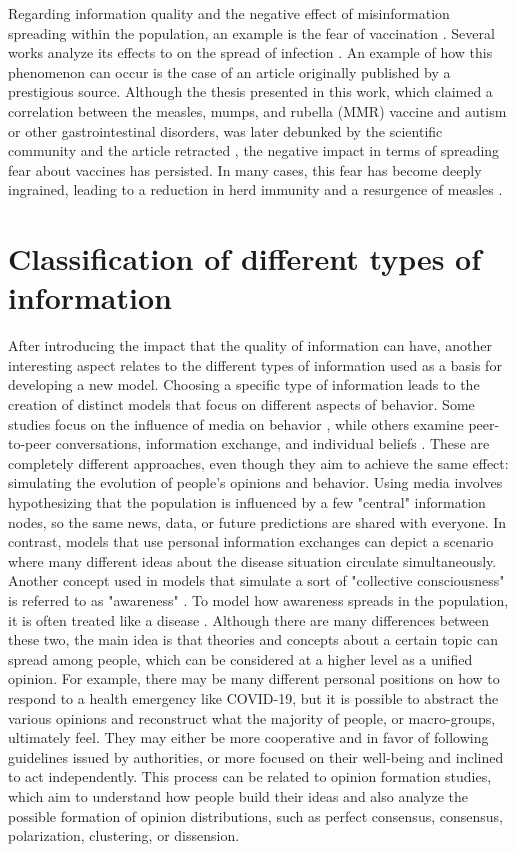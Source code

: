 Regarding information quality and the negative effect of misinformation spreading within the population, an example is the fear of vaccination \cite{Kahan_2013}. Several works analyze its effects to on the spread of infection \cite{Bauch_2012_game, Epstein_2021}.
An example of how this phenomenon can occur is the case of an article originally published by a prestigious source. Although the thesis presented in this work, which claimed a correlation between the measles, mumps, and rubella (MMR) vaccine and autism or other gastrointestinal disorders, was later debunked by the scientific community and the article retracted \cite{wakefield1998retracted}, the negative impact in terms of spreading fear about vaccines has persisted. In many cases, this fear has become deeply ingrained, leading to a reduction in herd immunity and a resurgence of measles \cite{Bauch_2012_overview}.

\section{Classification of different types of information}
After introducing the impact that the quality of information can have, another interesting aspect relates to the different types of information used as a basis for developing a new model. Choosing a specific type of information leads to the creation of distinct models that focus on different aspects of behavior. Some studies focus on the influence of media on behavior \cite{Collinson2014, Misra_2011}, while others examine peer-to-peer conversations, information exchange, and individual beliefs \cite{Tyson_2020}. These are completely different approaches, even though they aim to achieve the same effect: simulating the evolution of people's opinions and behavior. Using media involves hypothesizing that the population is influenced by a few "central" information nodes, so the same news, data, or future predictions are shared with everyone. In contrast, models that use personal information exchanges can depict a scenario where many different ideas about the disease situation circulate simultaneously.
Another concept used in models that simulate a sort of "collective consciousness" is referred to as "awareness" \cite{Funk2009}. To model how awareness spreads in the population, it is often treated like a disease \cite{Silva2019, Granell2013, Granell_2014, Kabir_2019, Zuo_2021, Wang_2019}. Although there are many differences between these two, the main idea is that theories and concepts about a certain topic can spread among people, which can be considered at a higher level as a unified opinion. For example, there may be many different personal positions on how to respond to a health emergency like COVID-19, but it is possible to abstract the various opinions and reconstruct what the majority of people, or macro-groups, ultimately feel. They may either be more cooperative and in favor of following guidelines issued by authorities, or more focused on their well-being and inclined to act independently.
This process can be related to opinion formation studies, which aim to understand how people build their ideas \cite{Devia_2023, Devia2022} and also analyze the possible formation of opinion distributions, such as perfect consensus, consensus, polarization, clustering, or dissension.

